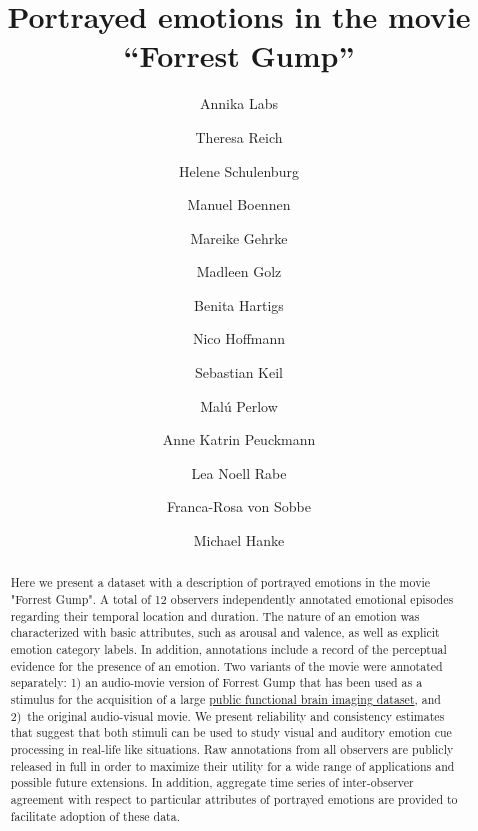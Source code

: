 \documentclass[10pt,a4paper,twocolumn]{article}
\begin{document}


\title{Portrayed emotions in the movie ``Forrest Gump''}

\author[1,*]{Annika Labs }
\author[1,*]{Theresa Reich }
\author[1,*]{Helene Schulenburg }
\author[1]{Manuel Boennen }
\author[1]{Mareike Gehrke }
\author[1]{Madleen Golz }
\author[1]{Benita Hartigs }
\author[1]{Nico Hoffmann }
\author[1]{Sebastian Keil }
\author[1]{Mal\'{u} Perlow }
\author[1]{Anne Katrin Peuckmann }
\author[1]{Lea Noell Rabe }
\author[1]{Franca-Rosa von Sobbe }
\author[1,2]{Michael Hanke }

\maketitle
\thispagestyle{fancy}

\begin{abstract}
Here we present a dataset with a description of portrayed emotions in the movie
"Forrest Gump". A total of 12 observers independently annotated emotional
episodes regarding their temporal location and duration. The nature of an
emotion was characterized with basic attributes, such as arousal and valence,
as well as explicit emotion category labels. In addition, annotations include a
record of the perceptual evidence for the presence of an emotion. Two
variants of the movie were annotated separately: 1) an audio-movie version of
Forrest Gump that has been used as a stimulus for the acquisition of a large
\href{http://studyforrest.org}{public functional brain imaging dataset}, and
2)~the original audio-visual movie. We present reliability and consistency
estimates that suggest that both stimuli can be used to study visual and
auditory emotion cue processing in real-life like situations. Raw annotations
from all observers are publicly released in full in order to maximize their
utility for a wide range of applications and possible future extensions. In
addition, aggregate time series of inter-observer agreement with respect to
particular attributes of portrayed emotions are provided to facilitate adoption
of these data.
\end{abstract}
\clearpage
\end{document}
